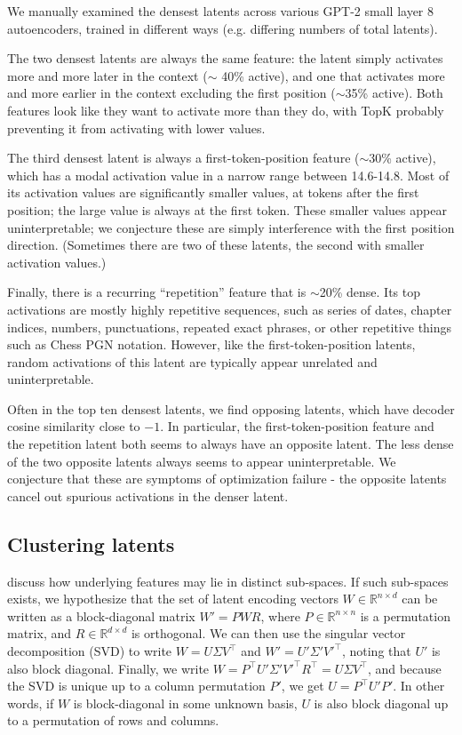 We manually examined the densest latents across various GPT-2 small layer 8 autoencoders, trained in different ways (e.g. differing numbers of total latents).

The two densest latents are always the same feature:  the latent simply activates more and more later in the context ($\sim$ 40\% active), and one that activates more and more earlier in the context excluding the first position ($\sim$35\% active).  Both features look like they want to activate more than they do, with TopK probably preventing it from activating with lower values.

The third densest latent is always a first-token-position feature ($\sim$30\% active), which has a modal activation value in a narrow range between 14.6-14.8.  Most of its activation values are significantly smaller values, at tokens after the first position; the large value is always at the first token.  These smaller values appear uninterpretable; we conjecture these are simply interference with the first position direction.  (Sometimes there are two of these latents, the second with smaller activation values.)

Finally, there is a recurring ``repetition'' feature that is $\sim$20\% dense.  Its top activations are mostly highly repetitive sequences, such as series of dates, chapter indices, numbers, punctuations, repeated exact phrases, or other repetitive things such as Chess PGN notation.  However, like the first-token-position latents, random activations of this latent are typically appear unrelated and uninterpretable.

Often in the top ten densest latents, we find opposing latents, which have decoder cosine similarity close to $-1$.  In particular, the first-token-position feature and the repetition latent both seems to always have an opposite latent.  The less dense of the two opposite latents always seems to appear uninterpretable.  We conjecture that these are symptoms of optimization failure - the opposite latents cancel out spurious activations in the denser latent.


\subsection{Clustering latents}

\citep{elhage2022toy} discuss how underlying features may lie in distinct sub-spaces. 
If such sub-spaces exists, we hypothesize that the set of latent encoding vectors $W \in \mathbb{R}^{n \times d}$ can be written as a block-diagonal matrix $W' = P W R$, where $P \in \mathbb{R}^{n \times n}$ is a permutation matrix, and $R \in \mathbb{R}^{d \times d}$ is  orthogonal. 
We can then use the singular vector decomposition (SVD) to write $W = U \Sigma V^\top$ and $W' = U' \Sigma' V'^\top$, noting that $U'$ is also block diagonal. Finally, we write $W = P^\top U' \Sigma' V'^\top R^\top = U \Sigma V^\top$, and because the SVD is unique up to a column permutation $P'$, we get $U = P^\top U' P'$. In other words, if $W$ is block-diagonal in some unknown basis, $U$ is also block diagonal up to a permutation of rows and columns.

